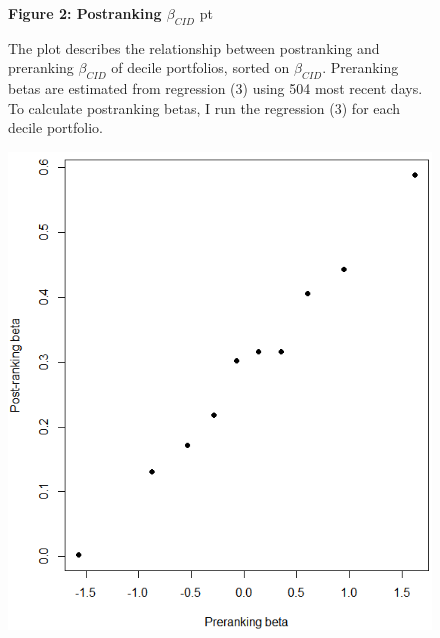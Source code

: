 \documentclass[12pt]{article}
\begin{document}
\begin{figure}
\textbf{Figure 2: Postranking $\beta_{CID}$}
 pt
\begin{flushleft}
{The plot describes the relationship between postranking and preranking $\beta_{CID}$ of decile portfolios, sorted on $\beta_{CID}$. Preranking betas are estimated from regression (3) using 504 most recent days. To calculate postranking betas, I run the  regression (3) for each decile portfolio.}
\end{flushleft}
\centering
\includegraphics[width=1\textwidth]{fig2.png}
\end{figure}
\end{document}
